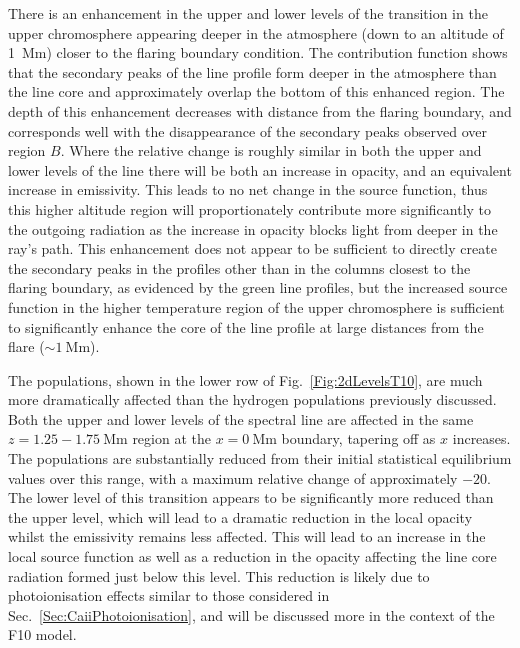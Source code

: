 There is an enhancement in the upper and lower levels of the \Ha{} transition in the upper chromosphere appearing deeper in the atmosphere (down to an altitude of \SI{1}{\mega\metre}) closer to the flaring boundary condition.
The contribution function shows that the secondary peaks of the \Ha{} line profile form deeper in the atmosphere than the line core and approximately overlap the bottom of this enhanced region.
The depth of this enhancement decreases with distance from the flaring boundary, and corresponds well with the disappearance of the secondary peaks observed over region $B$.
Where the relative change is roughly similar in both the upper and lower levels of the \Ha{} line there will be both an increase in opacity, and an equivalent increase in emissivity.
This leads to no net change in the source function, thus this higher altitude region will proportionately contribute more significantly to the outgoing radiation as the increase in opacity blocks light from deeper in the ray's path.
This enhancement does not appear to be sufficient to directly create the secondary peaks in the \Ha{} profiles other than in the columns closest to the flaring boundary, as evidenced by the green line profiles, but the increased source function in the higher temperature region of the upper chromosphere is sufficient to significantly enhance the core of the line profile at large distances from the flare ($\sim\SI{1}{\mega\metre}$).

The \Caii{} populations, shown in the lower row of Fig.~\ref{Fig:2dLevelsT10}, are much more dramatically affected than the hydrogen populations previously discussed.
Both the upper and lower levels of the \CaLine{} spectral line are affected in the same $z=1.25-\SI{1.75}{\mega\metre}$ region at the $x=\SI{0}{\mega\metre}$ boundary, tapering off as $x$ increases.
The populations are substantially reduced from their initial statistical equilibrium values over this range, with a maximum relative change of approximately $-20$.
The lower level of this transition appears to be significantly more reduced than the upper level, which will lead to a dramatic reduction in the local opacity whilst the emissivity remains less affected.
This will lead to an increase in the local source function as well as a reduction in the opacity affecting the line core radiation formed just below this level.
This reduction is likely due to photoionisation effects similar to those considered in Sec.~\ref{Sec:CaiiPhotoionisation}, and will be discussed more in the context of the F10 model.

